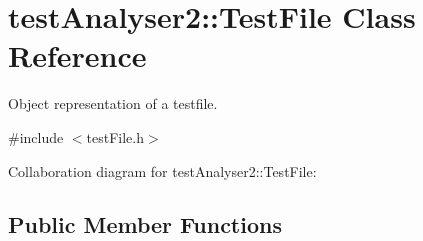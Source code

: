 \hypertarget{classtestAnalyser2_1_1TestFile}{}\section{test\+Analyser2\+::Test\+File Class Reference}
\label{classtestAnalyser2_1_1TestFile}


Object representation of a testfile.  




{\ttfamily \#include $<$test\+File.\+h$>$}



Collaboration diagram for test\+Analyser2\+::Test\+File\+:
\subsection*{Public Member Functions}

